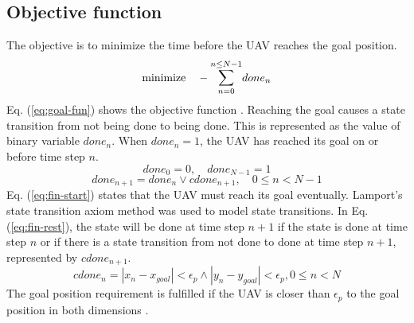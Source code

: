 \subsection{Objective function}
The objective is to minimize the time before the UAV reaches the goal position.
\begin{equation}
\label{eq:goal-fun}
\text{minimize} \quad - \mathlarger{\sum}_{n=0}^{n \leq N - 1} done_n
\end{equation}
Eq. (\ref{eq:goal-fun}) shows the objective function \cite{Bellingham2002}. Reaching the goal causes a state transition from not being done to being done. This is represented as the value of binary variable $done_n$. When $done_n = 1$, the UAV has reached its goal on or before time step $n$.
\begin{equation}
\label{eq:fin-start}
done_0 = 0, \quad done_{N - 1} = 1
\end{equation}
\begin{equation}
\label{eq:fin-rest}
done_{n+1} = done_n \vee cdone_{n+1},  \quad 0 \leq n < N - 1
\end{equation}
Eq. (\ref{eq:fin-start}) states that the UAV must reach its goal eventually. 
Lamport's state transition axiom method \cite{Lamport1989} was used to model state transitions. In Eq. (\ref{eq:fin-rest}), the state will be done at time step $n+1$ if the state is done at time step $n$ or if there is a state transition from not done to done at time step $n + 1$, represented by $cdone_{n+1}$.
\begin{equation}
\label{eq:cfin-p}
cdone_n = |x_{n} - x_{goal}| < \epsilon_{p} \wedge  |y_{n} - y_{goal}| < \epsilon_{p}, 0 \leq n < N
\end{equation}
The goal position requirement is fulfilled if the UAV is closer than $\epsilon_p$ to the goal position in both dimensions \cite{Bellingham2002}.
